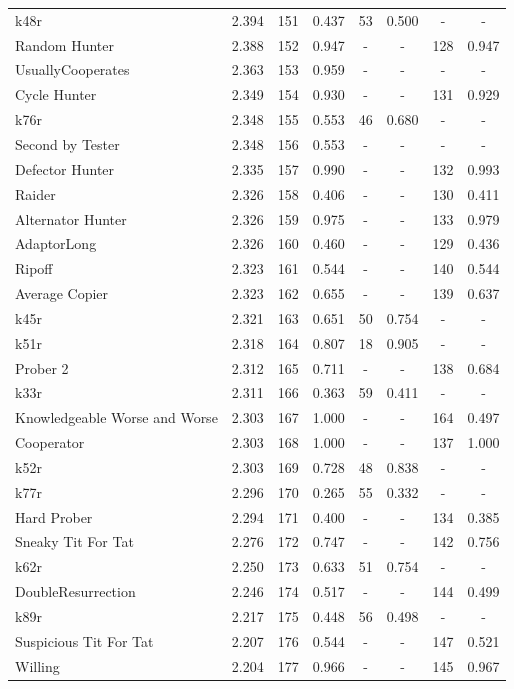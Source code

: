 \begin{tabular}{lccccccc}
k48r & 2.394 & 151 & 0.437 & 53 & 0.500 & - & - \\
Random Hunter & 2.388 & 152 & 0.947 & - & - & 128 & 0.947 \\
UsuallyCooperates & 2.363 & 153 & 0.959 & - & - & - & - \\
Cycle Hunter & 2.349 & 154 & 0.930 & - & - & 131 & 0.929 \\
k76r & 2.348 & 155 & 0.553 & 46 & 0.680 & - & - \\
Second by Tester & 2.348 & 156 & 0.553 & - & - & - & - \\
Defector Hunter & 2.335 & 157 & 0.990 & - & - & 132 & 0.993 \\
Raider & 2.326 & 158 & 0.406 & - & - & 130 & 0.411 \\
Alternator Hunter & 2.326 & 159 & 0.975 & - & - & 133 & 0.979 \\
AdaptorLong & 2.326 & 160 & 0.460 & - & - & 129 & 0.436 \\
Ripoff & 2.323 & 161 & 0.544 & - & - & 140 & 0.544 \\
Average Copier & 2.323 & 162 & 0.655 & - & - & 139 & 0.637 \\
k45r & 2.321 & 163 & 0.651 & 50 & 0.754 & - & - \\
k51r & 2.318 & 164 & 0.807 & 18 & 0.905 & - & - \\
Prober 2 & 2.312 & 165 & 0.711 & - & - & 138 & 0.684 \\
k33r & 2.311 & 166 & 0.363 & 59 & 0.411 & - & - \\
Knowledgeable Worse and Worse & 2.303 & 167 & 1.000 & - & - & 164 & 0.497 \\
Cooperator & 2.303 & 168 & 1.000 & - & - & 137 & 1.000 \\
k52r & 2.303 & 169 & 0.728 & 48 & 0.838 & - & - \\
k77r & 2.296 & 170 & 0.265 & 55 & 0.332 & - & - \\
Hard Prober & 2.294 & 171 & 0.400 & - & - & 134 & 0.385 \\
Sneaky Tit For Tat & 2.276 & 172 & 0.747 & - & - & 142 & 0.756 \\
k62r & 2.250 & 173 & 0.633 & 51 & 0.754 & - & - \\
DoubleResurrection & 2.246 & 174 & 0.517 & - & - & 144 & 0.499 \\
k89r & 2.217 & 175 & 0.448 & 56 & 0.498 & - & - \\
Suspicious Tit For Tat & 2.207 & 176 & 0.544 & - & - & 147 & 0.521 \\
Willing & 2.204 & 177 & 0.966 & - & - & 145 & 0.967 \\

\end{tabular}

